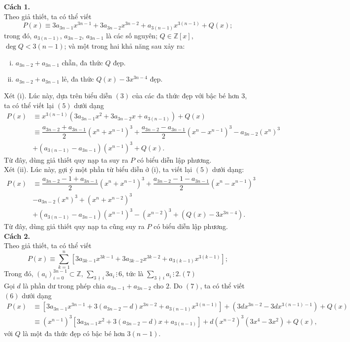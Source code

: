 \begin{bt}
{	\textbf{Cách 1.}\\
	Theo giả thiết, ta có thể viết \[ P(x)\equiv 3a_{3n-1}x^{3n-1}+3a_{3n-2}x^{3n-2}+a_{3(n-1)}x^{3(n-1)}+Q(x);\tag{5}\] 
	trong đó, $a_{3(n-1)}$, $a_{3n-2}$, $a_{3n-1}$ là các số nguyên; $Q\in\mathbb{Z}[x]$, $\deg Q < 3(n-1)$; và một trong hai khả năng sau xảy ra:
	\begin{enumerate}[(i)] 
		\item $a_{3n-2}+a_{3n-1}$ chẵn, đa thức $Q$ đẹp.
		\item $a_{3n-2}+a_{3n-1}$ lẻ, đa thức $Q(x)-3x^{3n-4}$ đẹp.  
	\end{enumerate} 
	Xét (i). Lúc này, dựa trên biểu diễn $(3)$ của các đa thức đẹp với bậc bé hơn $3$, ta có thể viết lại $(5)$ dưới dạng
	\begin{align*}
	P(x)&\equiv x^{3(n-1)}\left(3a_{3n-1}x^{2}+3a_{3n-2}x+a_{3(n-1)}\right)+Q(x)\\
	&\equiv \dfrac{a_{3n-2}+a_{3n-1}}{2}(x^{n}+x^{n-1})^{3} +\dfrac{a_{3n-2}-a_{3n-1}}{2}(x^{n}-x^{n-1})^{3}-a_{3n-2}(x^{n})^{3}\\
	 & +(a_{3(n-1)}-a_{3n-1})(x^{n-1})^{3}+Q(x).
	\end{align*} 
	Từ đây, dùng giả thiết quy nạp ta suy ra $P$ có biểu diễn lập phương.\\
	Xét (ii). Lúc này, gợi ý một phần từ biểu diễn ở (i), ta viết lại $(5)$ dưới dạng:
	{\allowdisplaybreaks
	\begin{align*}
	P(x)&\equiv \dfrac{a_{3n-2}-1+a_{3n-1}}{2}(x^{n}+x^{n-1})^{3}+\dfrac{a_{3n-2}-1-a_{3n-1}}{2}(x^{n}-x^{n-1})^{3}\\
	&-a_{3n-2}(x^{n})^{3}+(x^{n}+x^{n-2})^{3}\\
	&+(a_{3(n-1)}-a_{3n-1})(x^{n-1})^{3}-(x^{n-2})^{3}+(Q(x)-3x^{3n-4}).\end{align*}}Từ đây, dùng giả thiết quy nạp ta cũng suy ra $P$ có biểu diễn lập phương.\\
	\textbf{Cách 2.}\\
	Theo giả thiết, ta có thể viết \[P(x)\equiv \sum\limits_{k=1}^{n}\left[3a_{3k-1}x^{3k-1}+3a_{3k-2}x^{3k-2}+a_{3(k-1)}x^{3(k-1)}\right];\tag{6}\]
	Trong đó, $(a_i)_{i=0}^{3n-1}\subset \mathbb{Z}$, $\displaystyle\sum\limits_{3\,\nmid\,i}3a_{i}\,\vdots\,6$, tức là $\displaystyle\sum\limits_{3\,\nmid\, i}a_{i}\,\vdots\,2$.\hfill $(7)$
	\\Gọi $d$ là phần dư trong phép chia $a_{3n-1}+a_{3n-2}$ cho $2$. Do $(7)$, ta có thể viết $(6)$ dưới dạng \begin{align*}P(x)&\equiv \left[3a_{3n-1}x^{3n-1}+3(a_{3n-2}-d)x^{3n-2}+a_{3(n-1)}x^{3(n-1)}\right]+(3dx^{3n-2}-3dx^{3(n-1)-1})+Q(x)\\&\equiv \left(x^{n-1}\right)^{3}[ 3a_{3n-1}x^{2}+3(a_{3n-2}-d)x+a_{3(n-1)}]+d(x^{n-2})^{3}(3x^{4}-3x^{2})+Q(x), \tag{8}\end{align*} với $Q$ là một đa thức đẹp có bậc bé hơn $3(n-1).$ 
}
\end{bt}
